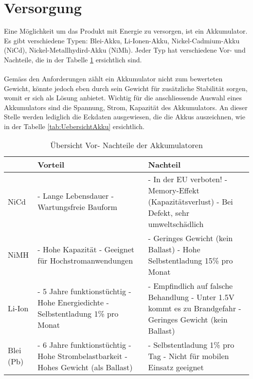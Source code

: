 \section{Versorgung}
Eine Möglichkeit um das Produkt mit Energie zu versorgen, ist ein Akkumulator. Es gibt verschiedene Typen: Blei-Akku, Li-Ionen-Akku, Nickel-Cadmium-Akku (NiCd), Nickel-Metallhydird-Akku (NiMh). Jeder Typ hat verschiedene Vor- und Nachteile, die in der Tabelle \ref{tab:UebersichtVorNachTeil} ersichtlich sind.\\
\\
Gemäss den Anforderungen zählt ein Akkumulator nicht zum bewerteten Gewicht, könnte jedoch eben durch sein Gewicht für zusätzliche Stabilität sorgen, womit er sich als Lösung anbietet. Wichtig für die anschliessende Auswahl eines Akkumulators sind die Spannung, Strom, Kapazität des Akkumulators. An dieser Stelle werden lediglich die Eckdaten ausgewiesen, die die Akkus auszeichnen, wie in der Tabelle \ref{tab:UebersichtAkku} ersichtlich.\\ 


\begin{table}[h!]
	\begin{tabular}{|p{1cm}|p{5cm}|p{6cm}|} \hline
		          &\textbf{Vorteil}  & \textbf{Nachteil}\tabularnewline \hline
		NiCd      &  - Lange Lebensdauer \newline - Wartungsfreie Bauform & - In der EU verboten! \newline -  Memory-Effekt (Kapazitätsverlust) \newline - Bei Defekt, sehr umweltschädlich \tabularnewline \hline
		NiMH      & - Hohe Kapazität \newline - Geeignet für Hochstromanwendungen  & - Geringes Gewicht (kein Ballast) \newline - Hohe Selbstentladung 15\% pro Monat \tabularnewline \hline
		Li-Ion    & - 5 Jahre funktionstüchtig \newline - Hohe Energiedichte \newline - Selbstentladung 1\% pro Monat & - Empfindlich auf falsche Behandlung \newline - Unter 1.5V kommt es zu Brandgefahr \newline - Geringes Gewicht (kein Ballast) \tabularnewline \hline
		Blei (Pb) & - 6 Jahre funktionstüchtig \newline - Hohe Strombelastbarkeit \newline - Hohes Gewicht (als Ballast)  & - Selbstentladung 1\% pro Tag \newline - Nicht für mobilen Einsatz geeignet  \tabularnewline \hline
	\end{tabular}
	\centering
	\caption{Übersicht Vor- Nachteile der Akkumulatoren}
	\label{tab:UebersichtVorNachTeil} 
\end{table}

